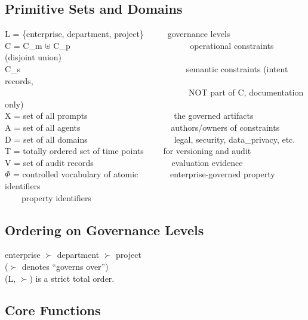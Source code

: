\subsection{Primitive Sets and Domains}
\label{sec:formal-model-A-1-1}


\begin{cladnote}
L = \{enterprise, department, project\}~~~~~\textemdash{} governance levels\\
C = C\_m $\uplus$ C\_p~~~~~~~~~~~~~~~~~~~~~~~~~~~~\textemdash{} operational constraints (disjoint union)\\
C\_s~~~~~~~~~~~~~~~~~~~~~~~~~~~~~~~~~~~~~~~\textemdash{} semantic constraints (intent records,\\
~~~~~~~~~~~~~~~~~~~~~~~~~~~~~~~~~~~~~~~~~~~~NOT part of C, documentation only)\\
X = set of all prompts~~~~~~~~~~~~~~~~~~~~\textemdash{} the governed artifacts\\
A = set of all agents~~~~~~~~~~~~~~~~~~~~~\textemdash{} authors/owners of constraints\\
D = set of all domains~~~~~~~~~~~~~~~~~~~~\textemdash{} legal, security, data\_privacy, etc.\\
T = totally ordered set of time points~~~~\textemdash{} for versioning and audit\\
V = set of audit records~~~~~~~~~~~~~~~~~~\textemdash{} evaluation evidence\\
$\Phi$ = controlled vocabulary of atomic~~~~~~~\textemdash{} enterprise-governed property identifiers\\
~~~~property identifiers
\end{cladnote}


\subsection{Ordering on Governance Levels}
\label{sec:formal-model-A-1-2}


\begin{claddisp}
enterprise $\succ$ department $\succ$ project\\
($\succ$ denotes ``governs over'')\\
(L, $\succ$) is a strict total order.
\end{claddisp}


\subsection{Core Functions}
\label{sec:formal-model-A-1-3}



